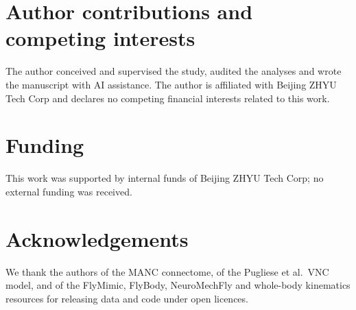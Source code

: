 \documentclass[11pt]{article}
\begin{document}
\section*{Author contributions and competing interests}
The author conceived and supervised the study, audited the analyses and wrote the manuscript with AI assistance. The author is affiliated with Beijing ZHYU Tech Corp and declares no competing financial interests related to this work.

\section*{Funding}
This work was supported by internal funds of Beijing ZHYU Tech Corp; no external funding was received.

\section*{Acknowledgements}
We thank the authors of the MANC connectome, of the Pugliese et al.\ VNC model, and of the FlyMimic, FlyBody, NeuroMechFly and whole-body kinematics resources for releasing data and code under open licences.



\end{document}
